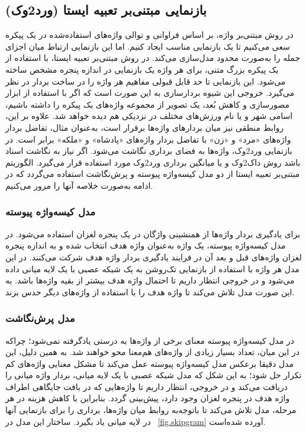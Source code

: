 \subsection{بازنمایی مبتنی‌بر تعبیه ایستا (ورد2وک)}
در روش مبتنی‌بر واژه،  بر اساس فراوانی و توالی واژه‌های استفاده‌شده در یک پیکره سعی می‌کنیم تا یک بازنمایی مناسب ایجاد کنیم. اما این بازنمایی ارتباط میان اجزای جمله را به‌صورت محدود مدل‌سازی می‌کند. در روش مبتنی‌بر تعبیه ایستا، با استفاده از یک پیکره بزرگ متنی، برای هر واژه یک بازنمایی در اندازه پنجره مشخص ساخته می‌شود. این بازنمایی تا حد قابل قبولی مفاهیم هر واژه را در ساخت بردار در نظر می‌گیرد. خروجی این شیوه بردارسازی به این صورت است که اگر با استفاده از ابزار مصورسازی و کاهش بُعد، یک تصویر از مجموعه واژه‌های یک پیکره را داشته باشیم، اسامی شهر و یا نام ورزش‌های مختلف در نزدیکی هم دیده خواهد شد. علاوه بر این، روابط منطقی نیز میان بردارهای واژه‌ها برقرار است، به‌عنوان مثال، تفاضل بردار واژه‌های «مرد» و «زن» با تفاضل بردار واژه‌های «پادشاه» و «ملکه» برابر است. در بازنمایی ورد2وک، واژه‌ها به فضای برداری نگاشت می‌شود. اگر نیاز به نگاشت اسناد باشد روش داک2وک و یا میانگین برداری ورد2وک مورد استفاده قرار می‌گیرد. الگوریتم مبتنی‌بر تعبیه ایستا از دو مدل کیسه‌واژه پیوسته و پرش‌نگاشت\citep{mikolov2013distributed} استفاده می‌گردد که در ادامه به‌صورت خلاصه آنها را مرور می‌کنیم.

\subsubsection{مدل کیسه‌واژه پیوسته}
برای یادگیری بردار واژه‌ها از همنشینی واژگان در یک پنجره لغزان استفاده می‌شود. در مدل کیسه‌واژه پیوسته، یک واژه به‌عنوان واژه هدف انتخاب شده و به اندازه پنجره لغزان واژه‌های قبل و بعد آن در فرایند یادگیری بردار واژه هدف شرکت می‌کنند. در این مدل هر واژه با استفاده از بازنمایی تک‌روشن به یک شبکه عصبی با یک لایه میانی داده می‌شود و در خروجی انتظار داریم تا احتمال واژه هدف بیشتر از بقیه واژه‌ها باشد. به این صورت مدل  تلاش می‌کند تا واژه هدف را با استفاده از واژه‌های دیگر حدس بزند.

\subsubsection{مدل پرش‌نگاشت}
در مدل کیسه‌واژه پیوسته معنای برخی از واژه‌ها به درستی یادگرفته نمی‌شود؛ چراکه در این میان، تعداد بسیار زیادی از واژه‌های هم‌معنا محو خواهند شد. به همین دلیل، این مدل دقیقا برعکس مدل کیسه‌واژه پیوسته عمل می‌کند تا مشکل معنایی واژه‌های کم تکرار حل شود؛ به این شکل که مدل شبکه عصبی با یک لایه میانی، بردار واژه میانی را دریافت می‌کند و در خروجی، انتظار داریم تا واژه‌هایی که در بافت جایگاهی اطراف واژه هدف در پنجره لغزان وجود دارد، پیش‌بینی گردد. بنابراین با کاهش هزینه در هر مرحله، مدل تلاش می‌کند تا باتوجه‌به روابط میان واژه‌ها، برداری را برای بازنمایی آنها در لایه میانی یاد بگیرد. ساختار این مدل در \figurename~\ref{fig.skipgram} آورده شده‌است.


